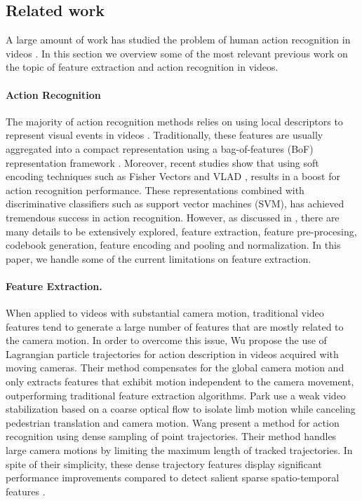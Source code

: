 \subsection{Related work}\label{subsec: related work}
A large amount of work has studied the problem of human action recognition in videos \cite{aggarwal2011}. In this section we overview some of the most relevant  previous work on the topic of feature extraction and action recognition in videos.

\paragraph{\textbf{Action Recognition}}The majority of action recognition methods relies on using local descriptors to represent visual events in videos \cite{laptev2005,dollar2005,wang2011}. Traditionally, these features are usually aggregated into a compact representation using a bag-of-features (BoF) representation framework \cite{laptev2008}. Moreover, recent studies show that using soft encoding techniques such as  Fisher Vectors \cite{perronnin2010} and VLAD \cite{jegou2012}, results in a boost for action recognition performance. These representations combined with discriminative classifiers such as support vector machines (SVM), has achieved tremendous success in action recognition. However, as discussed in \cite{xwang2013}, there are many details to be extensively explored, \ie feature extraction, feature pre-procesing, codebook generation, feature encoding and pooling and normalization. In this paper, we handle some of the current limitations on feature extraction.

\paragraph{\textbf{Feature Extraction.}} When applied to videos with substantial camera motion, traditional video features tend to generate a large number of features that are mostly related to the camera motion. In order to overcome this issue, Wu \etal \cite{wu2011} propose the use of Lagrangian particle trajectories for action description in videos acquired with moving cameras. Their method compensates for the global camera motion and only extracts features that exhibit motion independent to the camera movement, outperforming traditional feature extraction algorithms. Park \etal \cite{park2013} use a weak video stabilization based on a coarse optical flow to isolate limb motion while canceling pedestrian translation and camera motion. Wang \etal \cite{wang2011} present a method for action recognition using dense sampling of point trajectories. Their method handles large camera motions by limiting the maximum length of tracked trajectories. In spite of their simplicity, these dense trajectory features display significant performance improvements compared to detect salient sparse spatio-temporal features \cite{laptev2005}.


